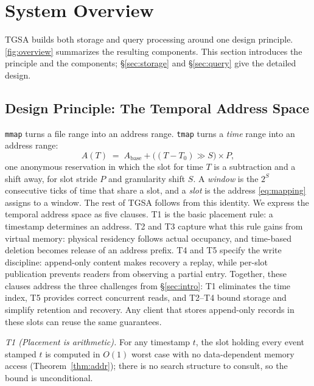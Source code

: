 \documentclass[sigconf,nonacm]{acmart}
\newcommand{\sys}{TGSA\xspace}
\newcommand{\tmap}{\texttt{tmap}\xspace}
\begin{document}
\section{System Overview}\label{sec:overview}
\sys builds both storage and query processing around one design
principle. \cref{fig:overview} summarizes the resulting components.
This section introduces the principle and the components;
\S\ref{sec:storage} and \S\ref{sec:query} give the detailed design.



\subsection{Design Principle: The Temporal Address Space}
\label{sec:tmap}\label{sec:tmap-principle}
\texttt{mmap} turns a file range into an address range. \tmap turns a
\emph{time} range into an address range:
\begin{equation}
A(T) \;=\; A_{\mathrm{base}} + \big((T - T_{0}) \gg S\big)\times P,
\label{eq:mapping}
\end{equation}
one anonymous reservation in which the slot for time $T$ is a
subtraction and a shift away, for slot stride $P$ and granularity shift
$S$. A \emph{window} is the $2^S$ consecutive ticks of time that share
a slot, and a \emph{slot} is the address \cref{eq:mapping} assigns to
a window. The rest of \sys follows from this identity. We express the temporal
address space as five clauses. T1 is the basic placement rule: a
timestamp determines an address. T2 and T3 capture what this rule gains
from virtual memory: physical residency follows actual occupancy, and
time-based deletion becomes release of an address prefix. T4 and T5
specify the write discipline: append-only content makes recovery a
replay, while per-slot publication prevents readers from observing a
partial entry. Together, these clauses address the three challenges
from \S\ref{sec:intro}: T1 eliminates the time index, T5 provides
correct concurrent reads, and T2--T4 bound storage and simplify
retention and recovery. Any client that stores append-only records in
these slots can reuse the same guarantees.

\emph{T1 (Placement is arithmetic).} For any timestamp $t$, the slot
holding every event stamped $t$ is computed in $O(1)$ worst case with no
data-dependent memory access (Theorem~\ref{thm:addr}); there is no
search structure to consult, so the bound is unconditional.
\end{document}
